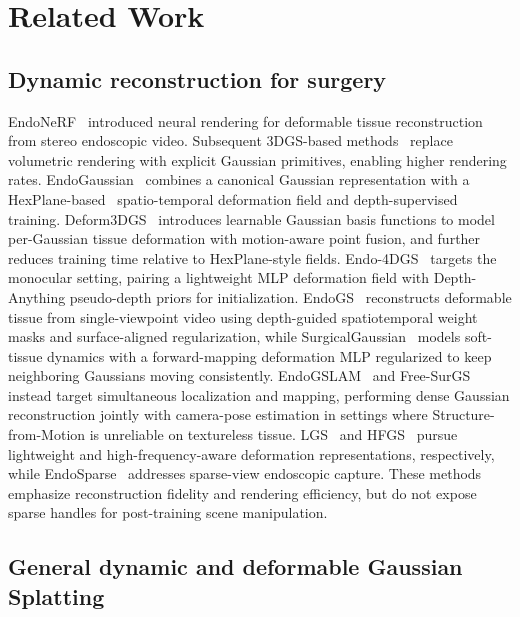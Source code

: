 \documentclass[AMA,Times1COL]{WileyNJDv5} %
\begin{document}
\section{Related Work}\label{sec2}

\subsection{Dynamic reconstruction for surgery}

EndoNeRF~\cite{wang2022endonerf} introduced neural rendering for deformable tissue reconstruction from stereo endoscopic video. Subsequent 3DGS-based methods~\cite{kerbl2023gaussian} replace volumetric rendering with explicit Gaussian primitives, enabling higher rendering rates. EndoGaussian~\cite{liu2024endogaussian} combines a canonical Gaussian representation with a HexPlane-based~\cite{cao2023hexplane} spatio-temporal deformation field and depth-supervised training. Deform3DGS~\cite{yang2024deform3dgs} introduces learnable Gaussian basis functions to model per-Gaussian tissue deformation with motion-aware point fusion, and further reduces training time relative to HexPlane-style fields. Endo-4DGS~\cite{huang2024endo4dgs} targets the monocular setting, pairing a lightweight MLP deformation field with Depth-Anything pseudo-depth priors for initialization. EndoGS~\cite{zhu2024endogs} reconstructs deformable tissue from single-viewpoint video using depth-guided spatiotemporal weight masks and surface-aligned regularization, while SurgicalGaussian~\cite{xie2024surgicalgaussian} models soft-tissue dynamics with a forward-mapping deformation MLP regularized to keep neighboring Gaussians moving consistently. EndoGSLAM~\cite{wang2024endogslam} and Free-SurGS~\cite{guo2024freesurgs} instead target simultaneous localization and mapping, performing dense Gaussian reconstruction jointly with camera-pose estimation in settings where Structure-from-Motion is unreliable on textureless tissue. LGS~\cite{liu2024lgs} and HFGS~\cite{zhao2024hfgs} pursue lightweight and high-frequency-aware deformation representations, respectively, while EndoSparse~\cite{li2024endosparse} addresses sparse-view endoscopic capture. These methods emphasize reconstruction fidelity and rendering efficiency, but do not expose sparse handles for post-training scene manipulation.

\subsection{General dynamic and deformable Gaussian Splatting}
\end{document}
